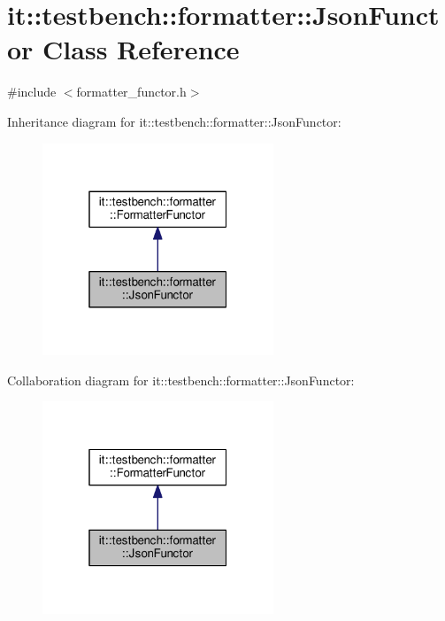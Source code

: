 \hypertarget{classit_1_1testbench_1_1formatter_1_1JsonFunctor}{\section{it\-:\-:testbench\-:\-:formatter\-:\-:Json\-Functor Class Reference}
\label{d0/def/classit_1_1testbench_1_1formatter_1_1JsonFunctor}
}


{\ttfamily \#include $<$formatter\-\_\-functor.\-h$>$}



Inheritance diagram for it\-:\-:testbench\-:\-:formatter\-:\-:Json\-Functor\-:
\nopagebreak
\begin{figure}[H]
\begin{center}
\leavevmode
\includegraphics[width=196pt]{d1/dd7/classit_1_1testbench_1_1formatter_1_1JsonFunctor__inherit__graph}
\end{center}
\end{figure}


Collaboration diagram for it\-:\-:testbench\-:\-:formatter\-:\-:Json\-Functor\-:
\nopagebreak
\begin{figure}[H]
\begin{center}
\leavevmode
\includegraphics[width=196pt]{d6/df6/classit_1_1testbench_1_1formatter_1_1JsonFunctor__coll__graph}
\end{center}
\end{figure}
